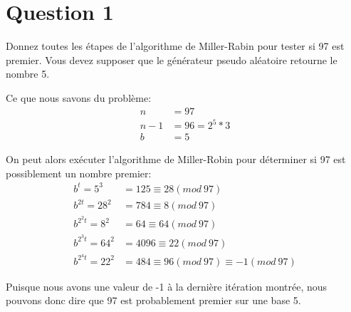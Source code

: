 \documentclass[devoir4.tex]{subfiles}
\begin{document}
\section*{Question 1}
Donnez toutes les étapes de l'algorithme de Miller-Rabin pour tester si 97 est premier. Vous devez supposer que le générateur pseudo aléatoire retourne le nombre 5.
\newline

Ce que nous savons du problème:
\begin{align*}
	n &= 97 \\
	n-1 &= 96 = 2^5 * 3 \\
	b &= 5
\end{align*}

On peut alors exécuter l'algorithme de Miller-Robin pour déterminer si 97 est possiblement un nombre premier:
\begin{align*}
	b^t = 5^3 &= 125 \equiv 28 (mod \:97) \\
	b^{2t} = 28^2 &= 784 \equiv 8 (mod \:97) \\
	b^{2^2t} = 8^2 &= 64 \equiv 64 (mod \:97) \\
	b^{2^3t} = 64^2 &= 4096 \equiv 22 (mod \:97) \\
	b^{2^4t} = 22^2 &= 484 \equiv 96 (mod \:97) \equiv -1 (mod \:97)
\end{align*}

Puisque nous avons une valeur de -1 à la dernière itération montrée, nous pouvons donc dire que 97 est probablement premier sur une base 5.
\end{document}
